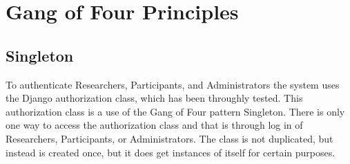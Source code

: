 \section{Gang of Four Principles}
\subsection{Singleton}
To authenticate Researchers, Participants, and Administrators the system uses the Django authorization class, which has been throughly tested.  This authorization class is a use of the Gang of Four pattern Singleton.  There is only one way to access the authorization class and that is through log in of Researchers, Participants, or Administrators.  The class is not duplicated, but instead is created once, but it does get instances of itself for certain purposes.